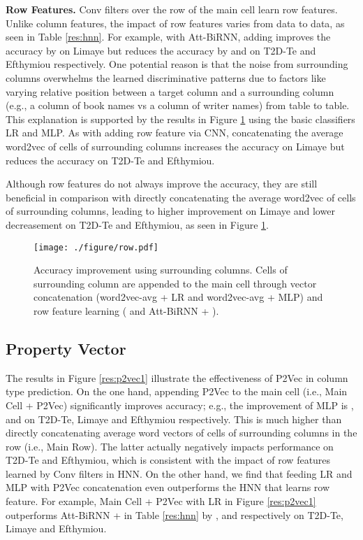 \documentclass{article}
\begin{document}
\vspace{0.1cm}
\noindent \textbf{Row Features.}
Conv filters over the row of the main cell learn row features.
Unlike column features, the impact of row features varies from data to data, as seen in Table \ref{res:hnn}.
For example, with Att-BiRNN,
adding  improves the accuracy by  on Limaye 
but reduces the accuracy by  and  on T2D-Te and Efthymiou respectively.
One potential reason is that the noise from surrounding columns overwhelms the learned discriminative patterns 
due to factors like varying relative position between a target column and a surrounding column (e.g., a column of book names vs a column of writer names) from table to table.
This explanation is supported by the results in Figure \ref{res:row} using the basic classifiers LR and MLP.
As with adding row feature via CNN, 
concatenating the average word2vec of cells of surrounding columns increases the accuracy on Limaye but reduces the accuracy on T2D-Te and Efthymiou.

Although row features do not always improve the accuracy, they are still beneficial in comparison with directly concatenating the average word2vec of cells of surrounding columns, leading to higher improvement on Limaye and lower decreasement on T2D-Te and Efthymiou, as seen in Figure \ref{res:row}.




\vspace{-0.15cm}
\begin{figure}[h]
\centering
\texttt{[image: ./figure/row.pdf]}
\vspace{-0.7cm}
\caption{\footnotesize
Accuracy improvement using surrounding columns.
Cells of surrounding column are appended to the main cell through vector concatenation (word2vec-avg + LR and word2vec-avg + MLP) and row feature learning ( and Att-BiRNN + ).
}
\label{res:row}
\end{figure}
\vspace{-0.1cm}

\subsection{Property Vector}
The results in Figure \ref{res:p2vec1} illustrate the effectiveness of P2Vec in column type prediction.
On the one hand, appending P2Vec to the main cell (i.e., Main Cell + P2Vec) significantly improves accuracy; e.g., the improvement of MLP is ,  and  on T2D-Te, Limaye and Efthymiou respectively.
This is much higher than directly concatenating average word vectors of cells of surrounding columns in the row (i.e., Main Row).
The latter actually negatively impacts performance on T2D-Te and Efthymiou,
which is consistent with the impact of row features learned by Conv filters in HNN.
On the other hand, we find that feeding LR and MLP with P2Vec concatenation even outperforms the HNN that learns row feature.
For example, Main Cell + P2Vec with LR in Figure \ref{res:p2vec1} outperforms Att-BiRNN +  in Table \ref{res:hnn} by ,  and  respectively on T2D-Te, Limaye and Efthymiou.
\end{document}
